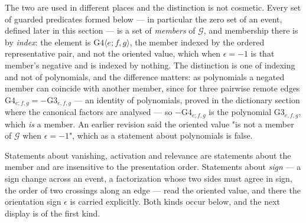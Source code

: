 \begin{definition}
\begin{enumerate}
The two are used in different places and the distinction is not cosmetic.
Every set of guarded predicates formed below --- in particular the zero set of
an event, defined later in this section --- is a set of \emph{members} of
$\mathcal G$, and membership there is by \emph{index}: the element is
$\mathrm{G4}\langle e;f,g\rangle$, the member indexed by the ordered
representative pair, and not the oriented value, which when $\epsilon=-1$ is
that member's negative and is indexed by nothing. The distinction is one of
indexing and not of polynomials, and the difference matters: as polynomials a
negated member can coincide with another member, since for three pairwise
remote edges $\mathrm{G4}_{e;f,g}=-\mathrm{G3}_{e,f,g}$ --- an identity of
polynomials, proved in the dictionary section where the canonical factors are
analysed --- so $-\mathrm{G4}_{e;f,g}$ is the polynomial $\mathrm{G3}_{e,f,g}$,
which \emph{is} a member. An earlier revision said the
oriented value "is not a member of $\mathcal G$ when $\epsilon=-1$", which as a
statement about polynomials is false.

Statements about vanishing, activation and relevance are statements about the
member and are insensitive to the presentation order. Statements about
\emph{sign} --- a sign change across an event, a factorization whose two sides
must agree in sign, the order of two crossings along an edge --- read the
oriented value, and there the orientation sign $\epsilon$ is carried
explicitly. Both kinds occur below, and the next display is of the first kind.


\end{enumerate}
\end{definition}
